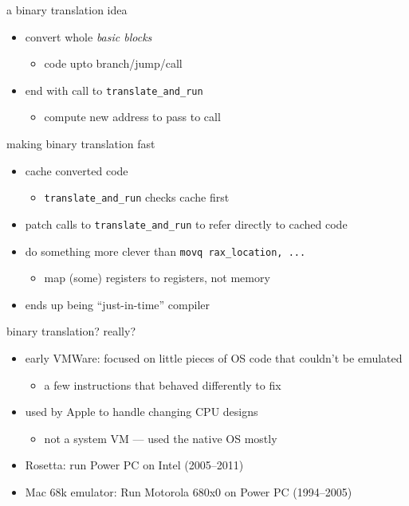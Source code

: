 \begin{frame}[fragile,label=binTransIdea2]{a binary translation idea}
    \begin{itemize}
    \item convert whole \textit{basic blocks}
        \begin{itemize}
        \item code upto branch/jump/call
        \end{itemize}
    \item end with call to {\tt translate\_and\_run}
        \begin{itemize}
        \item compute new  address to pass to call
        \end{itemize}
    \end{itemize}
\end{frame}

\begin{frame}[fragile,label=binTransIdea3]{making binary translation fast}
    \begin{itemize}
    \item cache converted code
        \begin{itemize}
        \item {\tt translate\_and\_run} checks cache first
        \end{itemize}
    \item patch calls to {\tt translate\_and\_run} to refer directly to cached code
    \item do something more clever than \lstinline|movq rax_location, ...|
        \begin{itemize}
        \item map (some) registers to registers, not memory
        \end{itemize}
    \item ends up being ``just-in-time'' compiler
    \end{itemize}
\end{frame}


\begin{frame}{binary translation? really?}
    \begin{itemize}
    \item early VMWare: focused on little pieces of OS code that couldn't be emulated
        \begin{itemize}
        \item a few instructions that behaved differently to fix
        \end{itemize}
    \item used by Apple to handle changing CPU designs
        \begin{itemize}
        \item not a system VM --- used the native OS mostly
        \end{itemize}
    \item Rosetta: run Power PC on Intel (2005--2011)
    \item Mac 68k emulator: Run Motorola 680x0 on Power PC (1994--2005)
    \end{itemize}
\end{frame}

